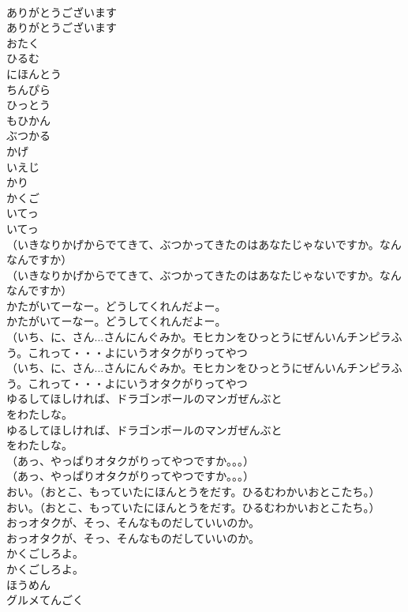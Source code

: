 \documentclass[8pt]{extreport}
\begin{document}
\begin{CJK}{UTF8}{min}
\\	ありがとうございます
\\	ありがとうございます
\\	おたく
\\	ひるむ
\\	にほんとう
\\	ちんぴら
\\	ひっとう
\\	もひかん
\\	ぶつかる
\\	かげ
\\	いえじ
\\	かり
\\	かくご
\\	いてっ
\\	いてっ
\\	（いきなりかげからでてきて、ぶつかってきたのはあなたじゃないですか。なんなんですか）
\\	（いきなりかげからでてきて、ぶつかってきたのはあなたじゃないですか。なんなんですか）
\\	かたがいてーなー。どうしてくれんだよー。
\\	かたがいてーなー。どうしてくれんだよー。
\\	（いち、に、さん...さんにんぐみか。モヒカンをひっとうにぜんいんチンピラふう。これって・・・よにいうオタクがりってやつ
\\	（いち、に、さん...さんにんぐみか。モヒカンをひっとうにぜんいんチンピラふう。これって・・・よにいうオタクがりってやつ
\\	ゆるしてほしければ、ドラゴンボールのマンガぜんぶと
\\	をわたしな。
\\	ゆるしてほしければ、ドラゴンボールのマンガぜんぶと
\\	をわたしな。
\\	（あっ、やっぱりオタクがりってやつですか。。。）
\\	（あっ、やっぱりオタクがりってやつですか。。。）
\\	おい。（おとこ、もっていたにほんとうをだす。ひるむわかいおとこたち。）
\\	おい。（おとこ、もっていたにほんとうをだす。ひるむわかいおとこたち。）
\\	おっオタクが、そっ、そんなものだしていいのか。
\\	おっオタクが、そっ、そんなものだしていいのか。
\\	かくごしろよ。
\\	かくごしろよ。
\\	ほうめん
\\	グルメてんごく

\end{CJK}
\end{document}
